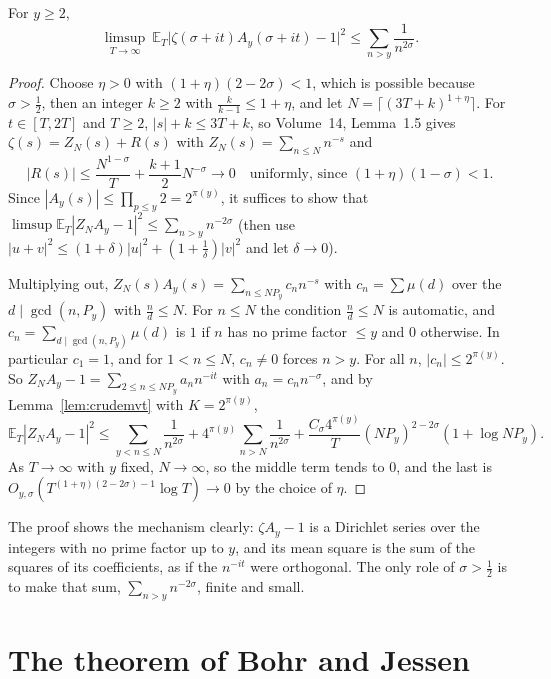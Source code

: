 \begin{proposition}\label{prop:mollified}
For $y\ge2$,
\[
\limsup_{T\to\infty}\ \mathbb E_T\bigl|\zeta(\sigma+it)A_y(\sigma+it)-1\bigr|^2\le\sum_{n>y}\frac1{n^{2\sigma}}.
\]
\end{proposition}
\begin{proof}
Choose $\eta>0$ with $(1+\eta)(2-2\sigma)<1$, which is possible because $\sigma>\frac12$, then an integer $k\ge2$ with $\frac k{k-1}\le1+\eta$, and let $N=\lceil(3T+k)^{1+\eta}\rceil$. For $t\in[T,2T]$ and $T\ge2$, $|s|+k\le3T+k$, so Volume~14, Lemma~1.5 gives $\zeta(s)=Z_N(s)+R(s)$ with $Z_N(s)=\sum_{n\le N}n^{-s}$ and
\[
|R(s)|\le\frac{N^{1-\sigma}}{T}+\frac{k+1}2N^{-\sigma}\longrightarrow0\quad\text{uniformly, since }(1+\eta)(1-\sigma)<1.
\]
Since $|A_y(s)|\le\prod_{p\le y}2=2^{\pi(y)}$, it suffices to show that $\limsup\mathbb E_T|Z_NA_y-1|^2\le\sum_{n>y}n^{-2\sigma}$ (then use $|u+v|^2\le(1+\delta)|u|^2+(1+\frac1\delta)|v|^2$ and let $\delta\to0$).

Multiplying out, $Z_N(s)A_y(s)=\sum_{n\le NP_y}c_nn^{-s}$ with $c_n=\sum\mu(d)$ over the $d\mid\gcd(n,P_y)$ with $\frac nd\le N$. For $n\le N$ the condition $\frac nd\le N$ is automatic, and $c_n=\sum_{d\mid\gcd(n,P_y)}\mu(d)$ is $1$ if $n$ has no prime factor $\le y$ and $0$ otherwise. In particular $c_1=1$, and for $1<n\le N$, $c_n\ne0$ forces $n>y$. For all $n$, $|c_n|\le2^{\pi(y)}$. So $Z_NA_y-1=\sum_{2\le n\le NP_y}a_nn^{-it}$ with $a_n=c_nn^{-\sigma}$, and by Lemma~\ref{lem:crudemvt} with $K=2^{\pi(y)}$,
\[
\mathbb E_T|Z_NA_y-1|^2\le\sum_{y<n\le N}\frac1{n^{2\sigma}}+4^{\pi(y)}\sum_{n>N}\frac1{n^{2\sigma}}+\frac{C_{\sigma}4^{\pi(y)}}T(NP_y)^{2-2\sigma}(1+\log NP_y).
\]
As $T\to\infty$ with $y$ fixed, $N\to\infty$, so the middle term tends to $0$, and the last is $O_{y,\sigma}(T^{(1+\eta)(2-2\sigma)-1}\log T)\to0$ by the choice of $\eta$.
\end{proof}

The proof shows the mechanism clearly: $\zeta A_y-1$ is a Dirichlet series over the integers with no prime factor up to $y$, and its mean square is the sum of the squares of its coefficients, as if the $n^{-it}$ were orthogonal. The only role of $\sigma>\frac12$ is to make that sum, $\sum_{n>y}n^{-2\sigma}$, finite and small.

\section{The theorem of Bohr and Jessen}

